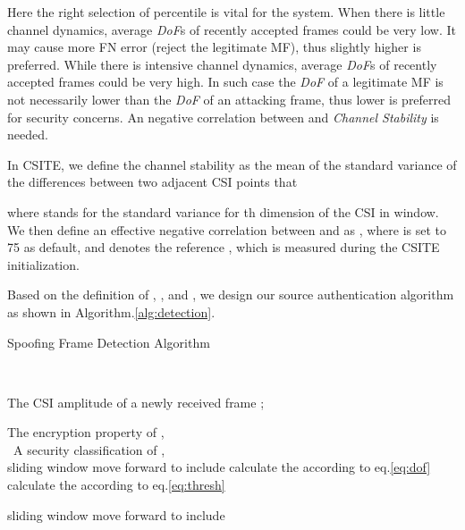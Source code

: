\documentclass[conference]{IEEEtran}
\begin{document}
Here the right selection of percentile  is vital for the system.
When there is little channel dynamics, average \textit{DoF}s of recently accepted frames could be very low. It may cause more FN error (reject the legitimate MF), thus slightly higher  is preferred.
While there is intensive channel dynamics, average \textit{DoF}s of recently accepted frames could be very high. In such case the \textit{DoF} of a legitimate MF is not necessarily lower than the \textit{DoF} of an attacking frame, thus lower  is preferred for security concerns. An negative correlation between  and \emph{Channel Stability} is needed.

In CSITE, we define the channel stability  as the mean of the
standard variance of the differences between two adjacent CSI points that


where  stands for the standard variance for th dimension of
the CSI in window.
We then define an effective negative correlation between  and  as
,
where  is set to 75 as default, and  denotes the
reference , which is measured during the CSITE
initialization.


Based on the definition of , , and , we design our source
authentication algorithm as shown in Algorithm.\ref{alg:detection}.

\begin{algorithm}[ht]
\caption{Spoofing Frame Detection Algorithm}
\label{alg:detection}
\begin{algorithmic}[1]
\REQUIRE \

The CSI amplitude of a newly received frame ;\

The encryption property of , \\
 
\ENSURE \
A security classification of , \\

\IF{}
\STATE sliding window  move forward to include 
\STATE 
\ELSE
\STATE calculate the  according to eq.\ref{eq:dof}
\STATE calculate the  according to eq.\ref{eq:thresh}

\IF{}
\STATE sliding window  move forward to include 
\STATE 
\ELSE
\STATE 
\ENDIF
\ENDIF
\ENDFOR
\end{algorithmic}
\end{algorithm}
\end{document}
